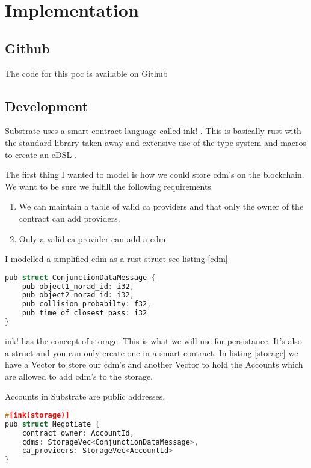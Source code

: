 \chapter{Implementation}

\section{Github}

The code for this \gls{poc} is available on Github \cite{github}

\section{Development}

Substrate uses a smart contract language called ink! \cite{ink}. This is basically rust with the standard
library taken away and extensive use of the type system and macros to create an eDSL \cite{edsl}.

The first thing I wanted to model is how we could store \gls{cdm}'s on the blockchain.
We want to be sure we fulfill the following requirements

\begin{enumerate}
    \item We can maintain a table of valid \acrshort{ca} providers and that only the owner of the contract can add 
        providers.
    \item Only a valid \acrshort{ca} provider can add a \gls{cdm}
\end{enumerate}

I modelled a simplified \gls{cdm} as a rust struct see listing \ref{cdm}

\begin{lstlisting}[label={cdm},language=c,caption={CDM Struct}]
pub struct ConjunctionDataMessage {
    pub object1_norad_id: i32,
    pub object2_norad_id: i32,
    pub collision_probabilty: f32,
    pub time_of_closest_pass: i32
}
\end{lstlisting}

ink! \cite{ink} has the concept of storage. This is what we will use for persistance. It's also a struct and you can only create one
in a smart contract. In listing \ref{storage} we have a Vector to store our \gls{cdm}'s and another Vector
to hold the Accounts which are allowed to add \gls{cdm}'s to the storage.


Accounts in Substrate are public addresses. 

\begin{lstlisting}[label={storage},language=c,caption={ink! storage}]
#[ink(storage)]
pub struct Negotiate {
    contract_owner: AccountId,
    cdms: StorageVec<ConjunctionDataMessage>,
    ca_providers: StorageVec<AccountId>
}
\end{lstlisting}

